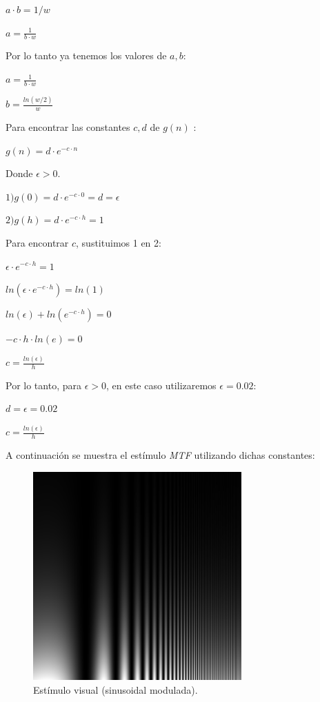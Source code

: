 \documentclass[conference]{IEEEtran}
\def\shadowLine{\vspace{3mm}}
\begin{document}
$a\cdot b = 1/w$

\shadowLine
$a = \displaystyle\frac{1}{b\cdot w}$

Por lo tanto ya tenemos los valores de $a, b$:

$a = \displaystyle\frac{1}{b\cdot w}$

\shadowLine
$b = \displaystyle\frac{ln(w/2)}{w}$

Para encontrar las constantes $c,d$ de $g(n)$ :

\shadowLine
$g(n)=d\cdot e^{-c\cdot n}$

Donde $\epsilon>0$.

\shadowLine
$1)g(0)=d\cdot e^{-c\cdot 0} = d = \epsilon$

\shadowLine
$2)g(h)=d\cdot e^{-c\cdot h} = 1$

Para encontrar $c$, sustituimos 1 en 2:

$\epsilon\cdot e^{-c\cdot h}=1$

\shadowLine
$ln(\epsilon\cdot e^{-c\cdot h})=ln(1)$

\shadowLine
$ln(\epsilon) + ln(e^{-c\cdot h})=0$

\shadowLine
$-c\cdot h\cdot ln(e)=0$

\shadowLine
$c = \displaystyle\frac{ln(\epsilon)}{h}$

Por lo tanto, para $\epsilon>0$, en este caso utilizaremos $\epsilon = 0.02$:

$d = \epsilon = 0.02$

\shadowLine
$c = \displaystyle\frac{ln(\epsilon)}{h}$

\shadowLine
A continuación se muestra el estímulo \textit{MTF} utilizando dichas constantes:

\begin{figure}[htbp]
\centerline{\includegraphics[width=80mm]{code/mtf}}
\caption{Estímulo visual (sinusoidal modulada).}
\label{mtf}
\end{figure}
\end{document}
